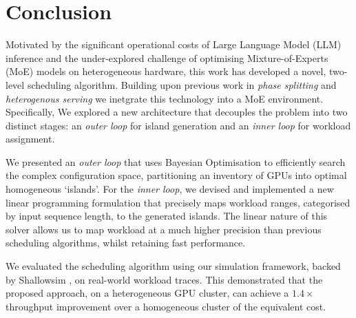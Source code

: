 \chapter{Conclusion}

%

%
%
%
%
%
%

 Motivated by the significant operational costs of Large Language Model (LLM) inference and the under-explored challenge of optimising Mixture-of-Experts (MoE) models on heterogeneous hardware, this work has developed a novel, two-level scheduling algorithm.
 Building upon previous work in \textit{phase splitting} \autocite{zhongDistServeDisaggregatingPrefill2024} \autocite{patelSplitwiseEfficientGenerative2024} and \textit{heterogenous serving} \autocite{jiangThunderServeHighperformanceCostefficient2025} \autocite{jiangHexGenGenerativeInference2024} we inetgrate this technology into a MoE environment.
 Specifically, We explored a new architecture that decouples the problem into two distinct stages: an \textit{outer loop} for island generation and an \textit{inner loop} for workload assignment.

We presented an \textit{outer loop} that uses Bayesian Optimisation to efficiently search the complex configuration space, partitioning an inventory of GPUs into optimal homogeneous `islands'.
For the \textit{inner loop}, we devised and implemented a new linear programming formulation that precisely maps workload ranges, categorised by input sequence length, to the generated islands.
The linear nature of this solver allows us to map workload at a much higher precision than previous scheduling algorithms, whilst retaining fast performance.

We evaluated the scheduling algorithm using our simulation framework, backed by Shallowsim \autocite{icezack12Icezack12Shallowsim2025}, on real-world workload traces.
This demonstrated that the proposed approach, on a heterogeneous GPU cluster, can achieve a $1.4\times$ throughput improvement over a homogeneous cluster of the equivalent cost.

